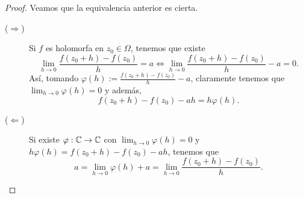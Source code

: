 \begin{proof}
Veamos que la equivalencia anterior es cierta. 
\begin{description}
\item[($\displaystyle \Rightarrow $)] Si $\displaystyle f $ es holomorfa en $\displaystyle z_{0} \in \Omega  $, tenemos que existe 
	\[\lim_{h \to 0}\frac{f\left(z_{0} + h\right)-f\left(z_{0}\right)}{h} = a \iff \lim_{h \to 0}\frac{f\left(z_{0} + h\right)-f\left(z_{0}\right)}{h}-a = 0.\]
Así, tomando $\displaystyle \varphi\left(h\right):=\frac{f\left(z_{0} + h\right)-f\left(z_{0}\right)}{h}-a $, claramente tenemos que $\displaystyle \lim_{h \to 0}\varphi\left(h\right)=0 $ y además,
\[f\left(z_{0}+h\right)-f\left(z_{0}\right)-ah = h\varphi\left(h\right) .\]
\item[($\displaystyle \Leftarrow $)] Si existe $\displaystyle \varphi : \mathbb{C} \to \mathbb{C} $ con $\displaystyle \lim_{h \to 0}\varphi\left(h\right)=0 $ y $\displaystyle h\varphi\left(h\right)=f\left(z_{0}+h\right)-f\left(z_{0}\right)-ah $, tenemos que 
	\[a = \lim_{h \to 0}\varphi\left(h\right) + a = \lim_{h \to 0}\frac{f\left(z_{0}+h\right)-f\left(z_{0}\right)}{h} .\]
\end{description}
\end{proof}

